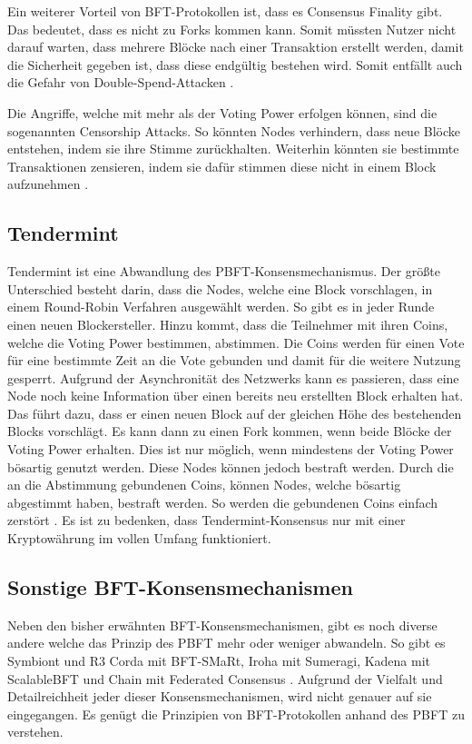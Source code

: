 Ein weiterer Vorteil von \acs{BFT}-Protokollen ist, dass es Consensus Finality gibt. Das bedeutet, dass es nicht zu Forks kommen kann. Somit müssten Nutzer nicht darauf warten, dass mehrere Blöcke nach einer Transaktion erstellt werden, damit die Sicherheit gegeben ist, dass diese endgültig bestehen wird. Somit entfällt auch die Gefahr von Double-Spend-Attacken \cite{Vukolicquestscalableblockchain2015}.

Die Angriffe, welche mit mehr als  der Voting Power erfolgen können, sind die sogenannten Censorship Attacks. So könnten Nodes verhindern, dass neue Blöcke entstehen, indem sie ihre Stimme zurückhalten. Weiterhin könnten sie bestimmte Transaktionen zensieren, indem sie dafür stimmen diese nicht in einem Block aufzunehmen \cite{TendermintTeamTendermintGithubRepository2018}.

\subsection{Tendermint}
Tendermint ist eine Abwandlung des \acs{PBFT}-Konsensmechanismus. Der größte Unterschied besteht darin, dass die Nodes, welche eine Block vorschlagen, in einem Round-Robin Verfahren ausgewählt werden. So gibt es in jeder Runde einen neuen Blockersteller. Hinzu kommt, dass die Teilnehmer mit ihren Coins, welche die Voting Power bestimmen, abstimmen. Die Coins werden für einen Vote für eine bestimmte Zeit an die Vote gebunden und damit für die weitere Nutzung gesperrt. Aufgrund der Asynchronität des Netzwerks kann es passieren, dass eine Node noch keine Information über einen bereits neu erstellten Block erhalten hat. Das führt dazu, dass er einen neuen Block auf der gleichen Höhe des bestehenden Blocks vorschlägt. Es kann dann zu einen Fork kommen, wenn beide Blöcke  der Voting Power erhalten. Dies ist nur möglich, wenn mindestens  der Voting Power bösartig genutzt werden. Diese Nodes können jedoch bestraft werden. Durch die an die Abstimmung gebundenen Coins, können Nodes, welche bösartig abgestimmt haben, bestraft werden. So werden die gebundenen Coins einfach zerstört \cite{KwonTendermintConsensusmining2014}\cite{BuchmanTendermintByzantineFault2016}. Es ist zu bedenken, dass Tendermint-Konsensus nur mit einer Kryptowährung im vollen Umfang funktioniert.

\subsection{Sonstige BFT-Konsensmechanismen}
Neben den bisher erwähnten \acs{BFT}-Konsensmechanismen, gibt es noch diverse andere welche das Prinzip des PBFT mehr oder weniger abwandeln. So gibt es Symbiont und R3 Corda mit BFT-SMaRt, Iroha mit Sumeragi, Kadena mit ScalableBFT und Chain mit Federated Consensus \cite{CachinBlockchainConsensusProtocols2017}. Aufgrund der Vielfalt und Detailreichheit jeder dieser Konsensmechanismen, wird nicht genauer auf sie eingegangen. Es genügt die Prinzipien von \acs{BFT}-Protokollen anhand des \acs{PBFT} zu verstehen.

